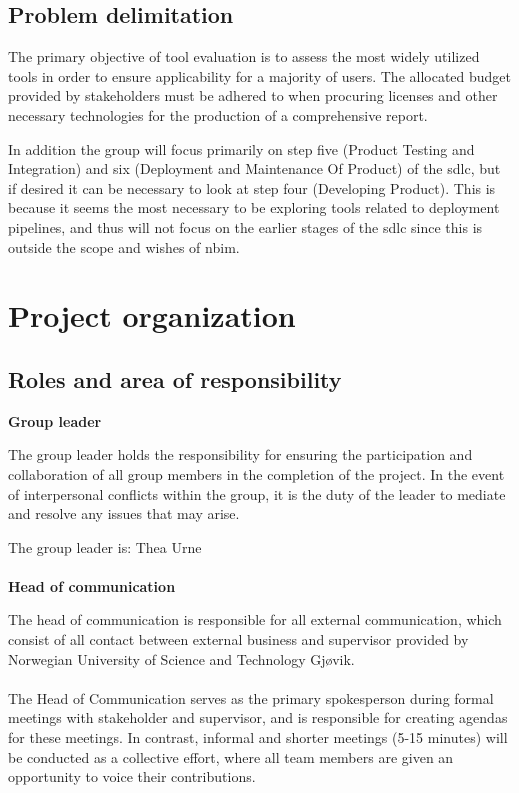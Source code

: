 \subsection{Problem delimitation}

The primary objective of tool evaluation is to assess the most widely utilized tools in order to ensure applicability for a majority of users. The allocated budget provided by stakeholders must be adhered to when procuring licenses and other necessary technologies for the production of a comprehensive report.

In addition the group will focus primarily on step five (Product Testing and Integration) and six (Deployment and Maintenance Of Product) of the \acrshort{sdlc}, but if desired it can be necessary to look at step four (Developing Product). This is because it seems the most necessary to be exploring tools related to deployment pipelines, and thus will not focus on the earlier stages of the \acrshort{sdlc} since this is outside the scope and wishes of \acrshort{nbim}.
\cite{The-Secure-Software-Supply-Chain} \cite{sdlc2}

\newpage
\section{Project organization}
\subsection{Roles and area of responsibility}

\textbf{Group leader}

The group leader holds the responsibility for ensuring the participation and collaboration of all group members in the completion of the project. In the event of interpersonal conflicts within the group, it is the duty of the leader to mediate and resolve any issues that may arise.

The group leader is: Thea Urne
\\~\\
\textbf{Head of communication}

The head of communication is responsible for all external communication, which consist of all contact between external business and supervisor provided by Norwegian University of Science and Technology Gjøvik. 
\\~\\
The Head of Communication serves as the primary spokesperson during formal meetings with stakeholder and supervisor, and is responsible for creating agendas for these meetings. In contrast, informal and shorter meetings (5-15 minutes) will be conducted as a collective effort, where all team members are given an opportunity to voice their contributions.

